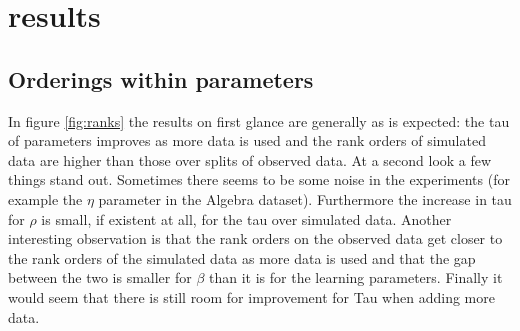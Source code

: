 \documentclass{scrartcl}
\begin{document}
\section{results}
\subsection{Orderings within parameters}
In figure \ref{fig:ranks} the results on first glance are generally as is expected: the tau of parameters improves as more data is used and the rank orders of simulated data are higher than those over splits of observed data. At a second look a few things stand out. Sometimes there seems to be some noise in the experiments (for example the $\eta$ parameter in the Algebra dataset). Furthermore the increase in tau for $\rho$ is small, if existent at all, for the tau over simulated data. Another interesting observation is that the rank orders on the observed data get closer to the rank orders of the simulated data as more data is used and that the gap between the two is smaller for $\beta$ than it is for the learning parameters. Finally it would seem that there is still room for improvement for Tau when adding more data.
\end{document}
